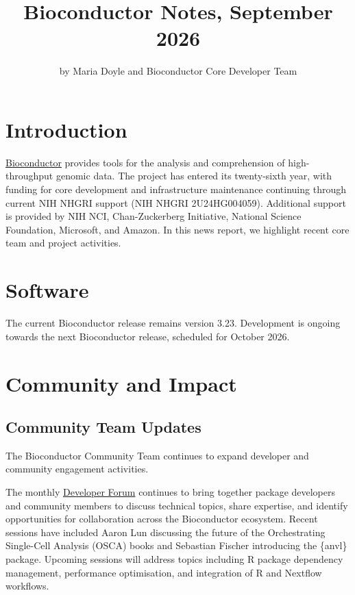 \title{Bioconductor Notes, September 2026}


\author{by Maria Doyle and Bioconductor Core Developer Team}

\maketitle


\section{Introduction}\label{introduction}

\href{https://bioconductor.org}{Bioconductor} provides
tools for the analysis and comprehension of high-throughput genomic
data. The project has entered its twenty-sixth year, with funding
for core development and infrastructure maintenance continuing through current NIH NHGRI support (NIH NHGRI 2U24HG004059). Additional support is provided
by NIH NCI, Chan-Zuckerberg Initiative, National Science Foundation,
Microsoft, and Amazon. In this news report, we highlight recent core team and project activities.

\section{Software}\label{software}

The current Bioconductor release remains version 3.23. Development is ongoing towards the next Bioconductor release, scheduled for October 2026.

\section{Community and Impact}\label{community-and-impact}

\subsection{Community Team Updates}\label{community-team-updates}

The Bioconductor Community Team continues to expand developer and community engagement activities.

The monthly \href{https://bioconductor.org/developers/developers-forum/}{Developer Forum} continues to bring together package developers and community members to discuss technical topics, share expertise, and identify opportunities for collaboration across the Bioconductor ecosystem. Recent sessions have included Aaron Lun discussing the future of the Orchestrating Single-Cell Analysis (OSCA) books and Sebastian Fischer introducing the \{anvl\} package. Upcoming sessions will address topics including R package dependency management, performance optimisation, and integration of R and Nextflow workflows.


